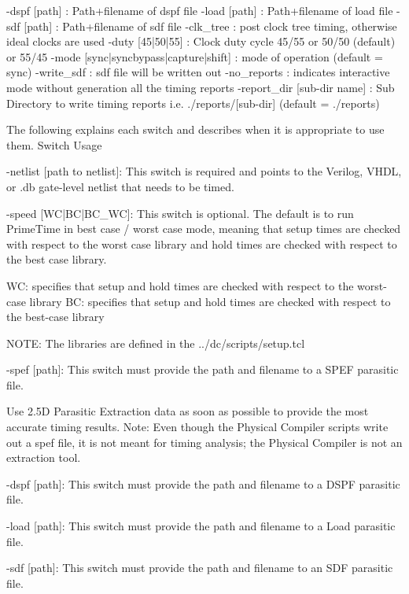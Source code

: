 \documentclass[a4paper,12pt,twoside]{article}
\begin{document}
\begin{enumerate}
      -dspf [path]                      : Path+filename of dspf file
      -load [path]                      : Path+filename of load file
      -sdf  [path]                      : Path+filename of sdf file
      -clk\_tree                        : post clock tree timing, otherwise ideal clocks are used
      -duty [45|50|55]                  : Clock duty cycle 45/55 or 50/50 (default) or 55/45
      -mode [sync|syncbypass|capture|shift] : mode of operation (default = sync)
      -write\_sdf                       : sdf file will be written out
      -no\_reports                      : indicates interactive mode without generation all the timing reports
      -report\_dir [sub-dir name]       : Sub Directory to write timing reports i.e. ./reports/[sub-dir] (default = ./reports)
    
    The following explains each switch and describes when it is appropriate to use them.
    Switch Usage
    
      -netlist [path to netlist]: This switch is required and points to the Verilog, VHDL,  or .db gate-level netlist that needs to be timed.
    
      -speed [WC|BC|BC\_WC]: This switch is optional. The default is to run PrimeTime in best case / worst case mode, meaning that setup times are checked with respect to the worst case library and hold times are checked with respect to the best case library.
    
         WC: specifies that setup and hold times are checked with respect to the worst-case library
         BC: specifies that setup and hold times are checked with respect to the best-case library
    
         NOTE: The libraries are defined in the ../dc/scripts/setup.tcl
     
      -spef [path]: This switch must provide the path and filename to a SPEF parasitic file.
    
         Use 2.5D Parasitic Extraction data as soon as possible to provide the most accurate timing results. Note: Even though the Physical Compiler scripts write out a spef file, it is not meant for timing analysis; the Physical Compiler is not an extraction tool.
    
      -dspf [path]: This switch must provide the path and filename to a DSPF parasitic file.
    
      -load [path]: This switch must provide the path and filename to a Load parasitic file.
    
      -sdf [path]: This switch must provide the path and filename to an SDF parasitic file.
    

\end{enumerate}
\end{document}
